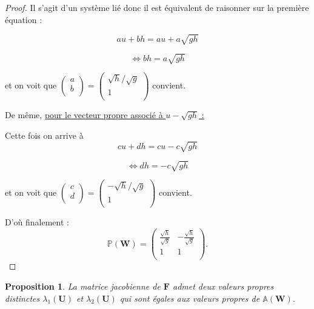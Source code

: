 \documentclass[
11pt, %
francais, %
singlespacing, %
headsepline, %
]{MastersDoctoralThesis} %
\newtheorem{prop}{Proposition}
\theoremstyle{definition}
\begin{document}
\begin{proof}
Il s'agit d'un système lié donc il est équivalent de raisonner sur la première équation :

$$au+bh = au+ a\sqrt{gh}$$

$$\Leftrightarrow bh = a\sqrt{gh}$$


et on voit que $\begin{pmatrix}
   a\\
   b\\
\end{pmatrix} = \begin{pmatrix}
   \sqrt{h}/\sqrt{g}\\
   1\\
\end{pmatrix}$ convient.

De même, \underline{pour le vecteur propre associé à $u -\sqrt{gh}$ :}


Cette fois on arrive à $$cu+dh = cu- c\sqrt{gh}$$

$$\Leftrightarrow dh = -c\sqrt{gh}$$


et on voit que $\begin{pmatrix}
   c\\
   d\\
\end{pmatrix} = \begin{pmatrix}
   -\sqrt{h}/\sqrt{g}\\
   1\\
\end{pmatrix}$ convient.


D'où finalement : $$\mathbb{P}(\textbf{W}) =\begin{pmatrix}
   \frac{\sqrt{h}}{\sqrt{g}} & -\frac{\sqrt{h}}{\sqrt{g}} \\
   1 & 1  \\
\end{pmatrix}.$$

\end{proof}


\begin{prop}

La matrice jacobienne de $\textbf{F}$ admet deux valeurs propres distinctes $\lambda_{1}(\textbf{U})$ et $\lambda_{2}(\textbf{U})$  qui sont égales aux valeurs 
propres de $\mathbb{A}(\textbf{W}).$

\end{prop}
\end{document}
